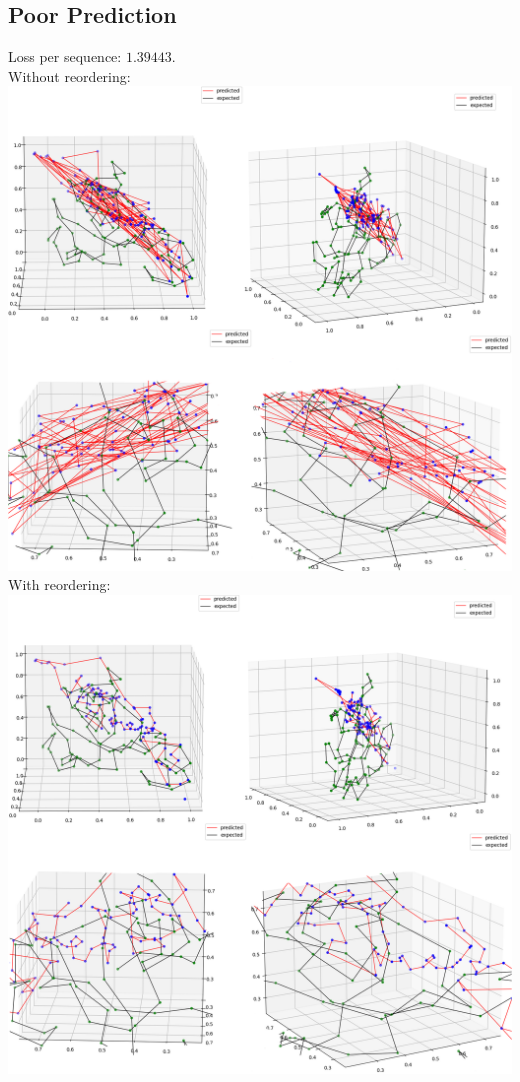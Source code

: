\documentclass[11pt]{article}
\newcommand{\np}{\newpage}
\begin{document}
\subsection{Poor Prediction}
Loss per sequence: $1.39443$.\\[3mm]
Without reordering:\\[2mm]
\includegraphics[scale=0.42]{worst1.png}\np
With reordering:\\[2mm]
\includegraphics[scale=0.42]{worst2.png}\np
\end{document}
